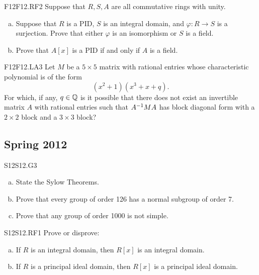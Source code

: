 \documentclass[../AlgebraQualSolutions.tex]{subfiles}
\begin{document}
\begin{prob}{F12}{F12.RF2}
Suppose that $R,S,A$ are all commutative rings with unity.
\begin{enumerate}[(a)]
\item Suppose that $R$ is a PID, $S$ is an integral domain, and $\varphi:R \to S$ is a surjection. Prove that either $\varphi$ is an isomorphism or $S$ is a field.
\item Prove that $A[x]$ is a PID if and only if $A$ is a field.
\end{enumerate}
\end{prob}

\begin{prob}{F12}{F12.LA3}
Let $M$ be a $5 \times 5$ matrix with rational entries whose characteristic polynomial is of the form
	\[(x^2+1)(x^3+x+q).\]
For which, if any, $q \in \mathbb{Q}$ is it possible that there does not exist an invertible matrix $A$ with rational entries such that $A^{-1} M A$ has block diagonal form with a $2 \times 2$ block and a $3 \times 3$ block?
\end{prob}

\subsection{Spring 2012}

\begin{prob}{S12}{S12.G3}
	\begin{enumerate}[(a)]
		\item State the Sylow Theorems.
		\item Prove that every group of order 126 has a normal subgroup of order 7.
		\item Prove that any group of order 1000 is not simple.
	\end{enumerate}
\end{prob}

\begin{prob}{S12}{S12.RF1}
	Prove or disprove:

	\begin{enumerate}[(a)]
		\item If $R$ is an integral domain, then $R[x]$ is an integral domain.
		\item If $R$ is a principal ideal domain, then $R[x]$ is a principal ideal domain.
	\end{enumerate}
\end{prob}
\end{document}
